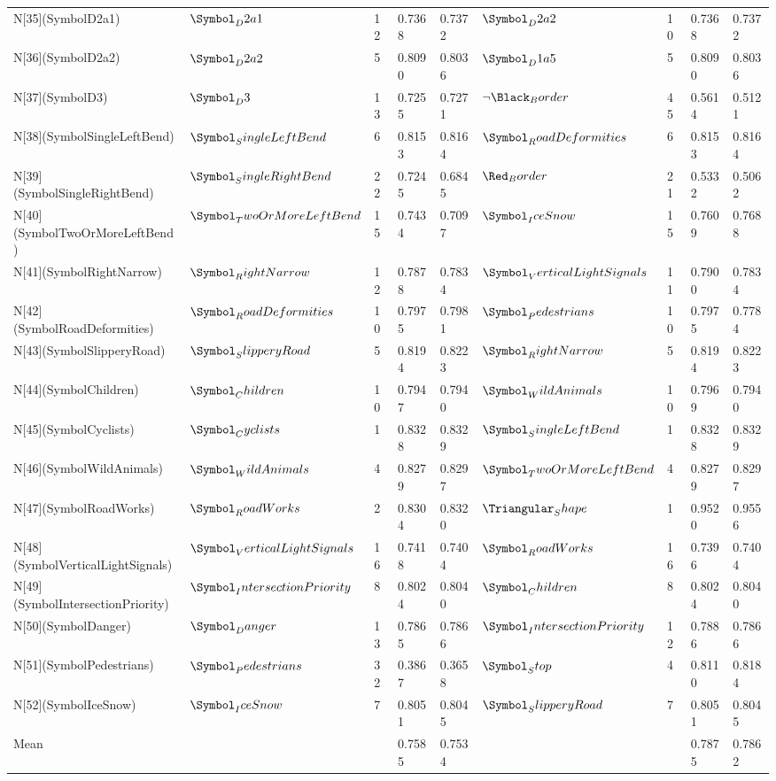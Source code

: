 \begin{tabular}{lllllllll}
N[35](SymbolD2a1) & $\Symbol_D2a1$ & 12 & 0.7368 & 0.7372 & $\Symbol_D2a2$ & 10 & 0.7368 & 0.7372 \\
N[36](SymbolD2a2) & $\Symbol_D2a2$ & 5 & 0.8090 & 0.8036 & $\Symbol_D1a5$ & 5 & 0.8090 & 0.8036 \\
N[37](SymbolD3) & $\Symbol_D3$ & 13 & 0.7255 & 0.7271 & $\neg \Black_Border$ & 45 & 0.5614 & 0.5121 \\
N[38](SymbolSingleLeftBend) & $\Symbol_SingleLeftBend$ & 6 & 0.8153 & 0.8164 & $\Symbol_RoadDeformities$ & 6 & 0.8153 & 0.8164 \\
N[39](SymbolSingleRightBend) & $\Symbol_SingleRightBend$ & 22 & 0.7245 & 0.6845 & $\Red_Border$ & 21 & 0.5332 & 0.5062 \\
N[40](SymbolTwoOrMoreLeftBend) & $\Symbol_TwoOrMoreLeftBend$ & 15 & 0.7434 & 0.7097 & $\Symbol_IceSnow$ & 15 & 0.7609 & 0.7688 \\
N[41](SymbolRightNarrow) & $\Symbol_RightNarrow$ & 12 & 0.7878 & 0.7834 & $\Symbol_VerticalLightSignals$ & 11 & 0.7900 & 0.7834 \\
N[42](SymbolRoadDeformities) & $\Symbol_RoadDeformities$ & 10 & 0.7975 & 0.7981 & $\Symbol_Pedestrians$ & 10 & 0.7975 & 0.7784 \\
N[43](SymbolSlipperyRoad) & $\Symbol_SlipperyRoad$ & 5 & 0.8194 & 0.8223 & $\Symbol_RightNarrow$ & 5 & 0.8194 & 0.8223 \\
N[44](SymbolChildren) & $\Symbol_Children$ & 10 & 0.7947 & 0.7940 & $\Symbol_WildAnimals$ & 10 & 0.7969 & 0.7940 \\
N[45](SymbolCyclists) & $\Symbol_Cyclists$ & 1 & 0.8328 & 0.8329 & $\Symbol_SingleLeftBend$ & 1 & 0.8328 & 0.8329 \\
N[46](SymbolWildAnimals) & $\Symbol_WildAnimals$ & 4 & 0.8279 & 0.8297 & $\Symbol_TwoOrMoreLeftBend$ & 4 & 0.8279 & 0.8297 \\
N[47](SymbolRoadWorks) & $\Symbol_RoadWorks$ & 2 & 0.8304 & 0.8320 & $\Triangular_Shape$ & 1 & 0.9520 & 0.9556 \\
N[48](SymbolVerticalLightSignals) & $\Symbol_VerticalLightSignals$ & 16 & 0.7418 & 0.7404 & $\Symbol_RoadWorks$ & 16 & 0.7396 & 0.7404 \\
N[49](SymbolIntersectionPriority) & $\Symbol_IntersectionPriority$ & 8 & 0.8024 & 0.8040 & $\Symbol_Children$ & 8 & 0.8024 & 0.8040 \\
N[50](SymbolDanger) & $\Symbol_Danger$ & 13 & 0.7865 & 0.7866 & $\Symbol_IntersectionPriority$ & 12 & 0.7886 & 0.7866 \\
N[51](SymbolPedestrians) & $\Symbol_Pedestrians$ & 32 & 0.3867 & 0.3658 & $\Symbol_Stop$ & 4 & 0.8110 & 0.8184 \\
N[52](SymbolIceSnow) & $\Symbol_IceSnow$ & 7 & 0.8051 & 0.8045 & $\Symbol_SlipperyRoad$ & 7 & 0.8051 & 0.8045 \\
Mean &  &  & 0.7585 & 0.7534 &  &  & 0.7875 & 0.7862 \\
\bottomrule
\end{tabular}
